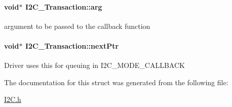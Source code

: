 \paragraph[{arg}]{\setlength{\rightskip}{0pt plus 5cm}void$\ast$ I2\-C\-\_\-\-Transaction\-::arg}\label{struct_i2_c___transaction_a29ec65addac2d4ef5d1235c2329e2fc1}
argument to be passed to the callback function 
\paragraph[{next\-Ptr}]{\setlength{\rightskip}{0pt plus 5cm}void$\ast$ I2\-C\-\_\-\-Transaction\-::next\-Ptr}\label{struct_i2_c___transaction_a21755edd4d999d6041d303e269596371}
Driver uses this for queuing in I2\-C\-\_\-\-M\-O\-D\-E\-\_\-\-C\-A\-L\-L\-B\-A\-C\-K 

The documentation for this struct was generated from the following file\-:\begin{DoxyCompactItemize}
\item 
\hyperlink{_i2_c_8h}{I2\-C.\-h}\end{DoxyCompactItemize}
